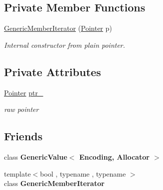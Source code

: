 \subsection*{Private Member Functions}
\begin{DoxyCompactItemize}
\item 
\hyperlink{class_generic_member_iterator_a76c372cd90c8abff942ab054c4992c74}{Generic\+Member\+Iterator} (\hyperlink{class_generic_member_iterator_ac69f141f1fde31c1f550f524a69c5de9}{Pointer} p)\hypertarget{class_generic_member_iterator_a76c372cd90c8abff942ab054c4992c74}{}\label{class_generic_member_iterator_a76c372cd90c8abff942ab054c4992c74}

\begin{DoxyCompactList}\small\item\em Internal constructor from plain pointer. \end{DoxyCompactList}\end{DoxyCompactItemize}
\subsection*{Private Attributes}
\begin{DoxyCompactItemize}
\item 
\hyperlink{class_generic_member_iterator_ac69f141f1fde31c1f550f524a69c5de9}{Pointer} \hyperlink{class_generic_member_iterator_a86d045bb193c966d92655a73fe813548}{ptr\+\_\+}\hypertarget{class_generic_member_iterator_a86d045bb193c966d92655a73fe813548}{}\label{class_generic_member_iterator_a86d045bb193c966d92655a73fe813548}

\begin{DoxyCompactList}\small\item\em raw pointer \end{DoxyCompactList}\end{DoxyCompactItemize}
\subsection*{Friends}
\begin{DoxyCompactItemize}
\item 
class {\bfseries Generic\+Value$<$ Encoding, Allocator $>$}\hypertarget{class_generic_member_iterator_a82bdd5798f1a5ac0e3e7ba4bd6938cfc}{}\label{class_generic_member_iterator_a82bdd5798f1a5ac0e3e7ba4bd6938cfc}

\item 
{\footnotesize template$<$bool , typename , typename $>$ }\\class {\bfseries Generic\+Member\+Iterator}\hypertarget{class_generic_member_iterator_aa375aeb1ffac85cddc3a72a6c24ec6e1}{}\label{class_generic_member_iterator_aa375aeb1ffac85cddc3a72a6c24ec6e1}

\end{DoxyCompactItemize}


